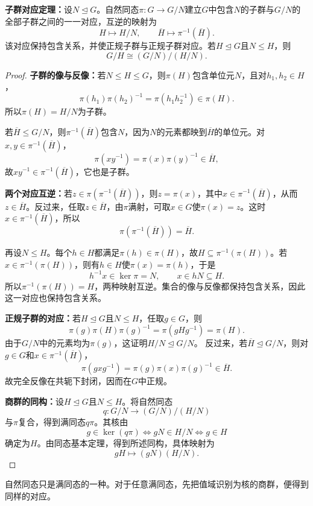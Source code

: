 \begin{theorem}\label{p2:correspondence}
\textbf{子群对应定理：}设$N\trianglelefteq G$。自然同态$\pi:G\to G/N$建立$G$中包含$N$的子群与$G/N$的全部子群之间的一一对应，互逆的映射为
\[
H\longmapsto H/N,\qquad
\overline H\longmapsto\pi^{-1}(\overline H).
\]
该对应保持包含关系，并使正规子群与正规子群对应。若$H\trianglelefteq G$且$N\leq H$，则
\[
G/H\cong(G/N)/(H/N).
\]
\end{theorem}
\begin{proof}
\textbf{子群的像与反像：}若$N\leq H\leq G$，则$\pi(H)$包含单位元$N$，且对$h_1,h_2\in H$，
\[
\pi(h_1)\pi(h_2)^{-1}=\pi(h_1h_2^{-1})\in\pi(H).
\]
所以$\pi(H)=H/N$为子群。

若$\overline H\leq G/N$，则$\pi^{-1}(\overline H)$包含$N$，因为$N$的元素都映到$\overline H$的单位元。对$x,y\in\pi^{-1}(\overline H)$，
\[
\pi(xy^{-1})=\pi(x)\pi(y)^{-1}\in\overline H,
\]
故$xy^{-1}\in\pi^{-1}(\overline H)$，它也是子群。

\textbf{两个对应互逆：}若$z\in\pi(\pi^{-1}(\overline H))$，则$z=\pi(x)$，其中$x\in\pi^{-1}(\overline H)$，从而$z\in\overline H$。反过来，任取$z\in\overline H$，由$\pi$满射，可取$x\in G$使$\pi(x)=z$。这时$x\in\pi^{-1}(\overline H)$，所以
\[
\pi(\pi^{-1}(\overline H))=\overline H.
\]

再设$N\leq H$。每个$h\in H$都满足$\pi(h)\in\pi(H)$，故$H\subseteq\pi^{-1}(\pi(H))$。若$x\in\pi^{-1}(\pi(H))$，则有$h\in H$使$\pi(x)=\pi(h)$，于是
\[
h^{-1}x\in\ker\pi=N,\qquad x\in hN\subseteq H.
\]
所以$\pi^{-1}(\pi(H))=H$，两种映射互逆。集合的像与反像都保持包含关系，因此这一对应也保持包含关系。

\textbf{正规子群的对应：}若$H\trianglelefteq G$且$N\leq H$，任取$g\in G$，则
\[
\pi(g)\pi(H)\pi(g)^{-1}=\pi(gHg^{-1})=\pi(H).
\]
由于$G/N$中的元素均为$\pi(g)$，这证明$H/N\trianglelefteq G/N$。
反过来，若$\overline H\trianglelefteq G/N$，则对$g\in G$和$x\in\pi^{-1}(\overline H)$，
\[
\pi(gxg^{-1})=\pi(g)\pi(x)\pi(g)^{-1}\in\overline H.
\]
故完全反像在共轭下封闭，因而在$G$中正规。

\textbf{商群的同构：}设$H\trianglelefteq G$且$N\leq H$。将自然同态
\[
q:G/N\longrightarrow(G/N)/(H/N)
\]
与$\pi$复合，得到满同态$q\pi$。其核由
\[
g\in\ker(q\pi)
\iff gN\in H/N
\iff g\in H
\]
确定为$H$。由同态基本定理，得到所述同构，具体映射为
\[
gH\longmapsto(gN)(H/N).
\]
\end{proof}

自然同态只是满同态的一种。对于任意满同态，先把值域识别为核的商群，便得到同样的对应。

